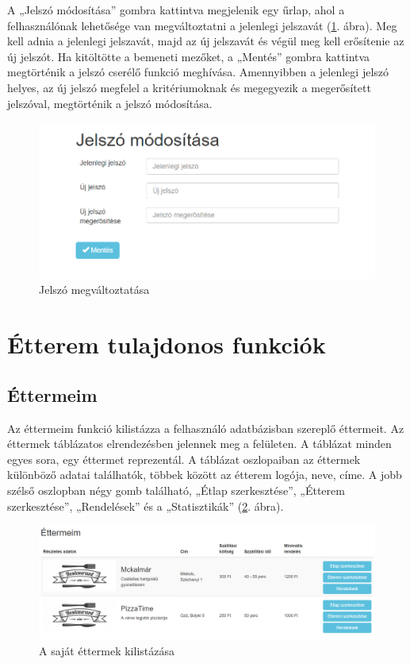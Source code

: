 A „Jelszó módosítása” gombra kattintva megjelenik egy űrlap, ahol a felhasználónak lehetősége van megváltoztatni a jelenlegi jelszavát (\ref{fig:password}. ábra). Meg kell adnia a jelenlegi jelszavát, majd az új jelszavát és végül meg kell erősítenie az új jelszót. Ha kitöltötte a bemeneti mezőket, a „Mentés” gombra kattintva megtörténik a jelszó cserélő funkció meghívása. Amennyibben a jelenlegi jelszó helyes, az új jelszó megfelel a kritériumoknak és megegyezik a megerősített jelszóval, megtörténik a jelszó módosítása.

\begin{figure}
\centering
\includegraphics[scale=0.8]{kepek/password.png}
\caption{Jelszó megváltoztatása}
\label{fig:password}
\end{figure}

\section{Étterem tulajdonos funkciók}

\subsection{Éttermeim}

Az éttermeim funkció kilistázza a felhasználó adatbázisban szereplő éttermeit. Az éttermek táblázatos elrendezésben jelennek meg a felületen. A táblázat minden egyes sora, egy éttermet reprezentál. A táblázat oszlopaiban az éttermek különböző adatai találhatók, többek között az étterem logója, neve, címe. A jobb szélső oszlopban négy gomb található, „Étlap szerkesztése”, „Étterem szerkesztése”, „Rendelések” és a „Statisztikák” (\ref{fig:my_restaurants}. ábra).

\begin{figure}
\centering
\includegraphics[scale=0.5]{kepek/my_restaurants.png}
\caption{A saját éttermek kilistázása}
\label{fig:my_restaurants}
\end{figure}

